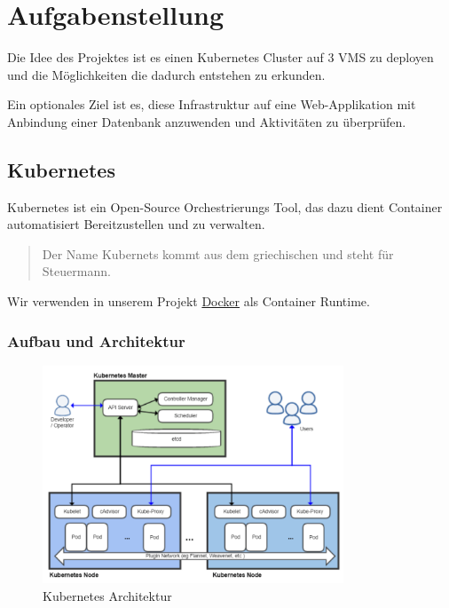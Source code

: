 \hypertarget{aufgabenstellung}{%
\section{Aufgabenstellung}\label{aufgabenstellung}}

Die Idee des Projektes ist es einen Kubernetes Cluster auf 3 VMS zu
deployen und die Möglichkeiten die dadurch entstehen zu erkunden.

Ein optionales Ziel ist es, diese Infrastruktur auf eine Web-Applikation
mit Anbindung einer Datenbank anzuwenden und Aktivitäten zu überprüfen.

\hypertarget{kubernetes}{%
\subsection{Kubernetes}\label{kubernetes}}

Kubernetes ist ein Open-Source Orchestrierungs Tool, das dazu dient
Container automatisiert Bereitzustellen und zu verwalten.

\begin{quote}
Der Name Kubernets kommt aus dem griechischen und steht für Steuermann.
\end{quote}

Wir verwenden in unserem Projekt \href{https://www.docker.com/}{Docker}
als Container Runtime.

\hypertarget{aufbau-und-architektur}{%
\subsubsection{Aufbau und Architektur}\label{aufbau-und-architektur}}

\begin{figure}
\centering
\includegraphics[width=0.8\textwidth]{./images/kuber.png}
\caption{Kubernetes Architektur}
\end{figure}

